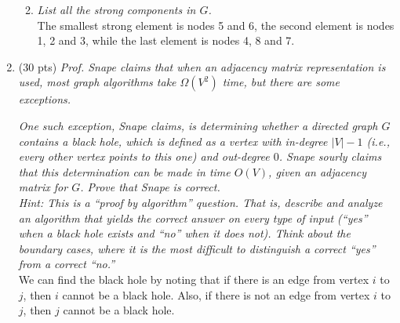 \documentclass[12pt]{article}
\begin{document}
\begin{enumerate}
\begin{enumerate}
\begin{center}
\begin{minipage}{0.6\textwidth}
\begin{center}
    	    \end{center}
	    \end{minipage}
	\end{center}

	\item \textit{List all the strong components in $G$.}\\
	The smallest strong element is nodes 5 and 6, the second element is nodes 1, 2 and 3, while the last element is nodes 4, 8 and 7.
	
	\end{enumerate}
	

    \newpage
	\item (30 pts) \textit{Prof. Snape claims that when an {\em adjacency matrix} representation is used, most graph algorithms take $\Omega(V^{2})$ time, 
but there are some exceptions.}

	\textit{One such exception, Snape claims, is determining whether a directed graph $G$ contains a \textit{black hole}, which is defined as a vertex 
with in-degree $|V|-1$ (i.e., every other vertex points to this one) and out-degree $0$. Snape sourly claims that this determination can be made in time 
$O(V)$, given an adjacency matrix for $G$. Prove that Snape is correct.}\\
	
	\textit{Hint: This is a ``proof by algorithm'' question. That is, describe and analyze an algorithm that yields the correct answer on every type of 
input (``yes'' when a black hole exists and ``no'' when it does not). Think about the boundary cases, where it is the most difficult to distinguish a correct 
``yes'' from a correct ``no.''}\\
	
    We can find the black hole by noting that if there is an edge from vertex $i$ to $j$, then $i$ cannot be a black hole. Also, if there is not an edge from 
vertex $i$ to $j$, then $j$ cannot be a black hole.\\
    

\end{enumerate}
\end{document}
